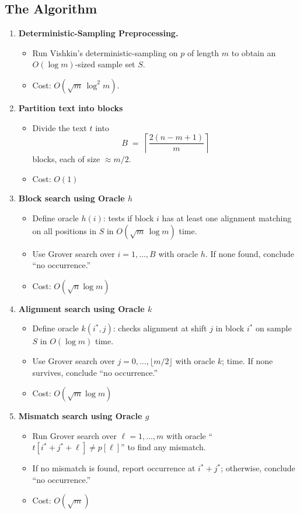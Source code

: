\documentclass[12pt]{IEEEtran}
\begin{document}
\subsection{The Algorithm}
\begin{enumerate}
    \item \textbf{Deterministic-Sampling Preprocessing.}
          \begin{itemize}
              \item Run Vishkin's deterministic-sampling on \(p\) of length \(m\) to obtain an \(O(\log m)\)-sized sample set \(S\).
              \item Cost: \(O(\sqrt{m}\,\log^2 m)\).
          \end{itemize}
    \item \textbf{Partition text into blocks}
          \begin{itemize}
              \item Divide the text \(t\) into
                    \[
                        B \;=\; \left\lceil \frac{2(n - m + 1)}{m} \right\rceil
                    \]
                    blocks, each of size \(\approx m/2\).
              \item Cost: \(O(1)\)
          \end{itemize}
    \item \textbf{Block search using Oracle \(h\)}
          \begin{itemize}
              \item Define oracle \(h(i)\): tests if block \(i\) has at least one alignment matching on all positions in \(S\) in \(O(\sqrt{m}\,\log m)\) time.
              \item Use Grover search over \(i=1,\dots,B\) with oracle \(h\). If none found, conclude ``no occurrence.''
              \item Cost: \(O(\sqrt{n} \log m)\)
          \end{itemize}
    \item \textbf{Alignment search using Oracle \(k\)}
          \begin{itemize}
              \item Define oracle \(k(i^*,j)\): checks alignment at shift \(j\) in block \(i^*\) on sample \(S\) in \(O(\log m)\) time.
              \item Use Grover search over \(j=0,\dots,\lfloor m/2\rfloor\) with oracle \(k\); time. If none survives, conclude ``no occurrence.''
              \item Cost: \(O(\sqrt{m} \log m)\)
          \end{itemize}
    \item \textbf{Mismatch search using Oracle \(g\)}
          \begin{itemize}
              \item Run Grover search over \(\ell=1,\dots,m\) with oracle ``\(t[i^*+j^*+\ell]\neq p[\ell]\)'' to find any mismatch.
              \item If no mismatch is found, report occurrence at \(i^*+j^*\); otherwise, conclude ``no occurrence.''
              \item Cost: \(O(\sqrt{m})\)
          \end{itemize}
\end{enumerate}
\end{document}

